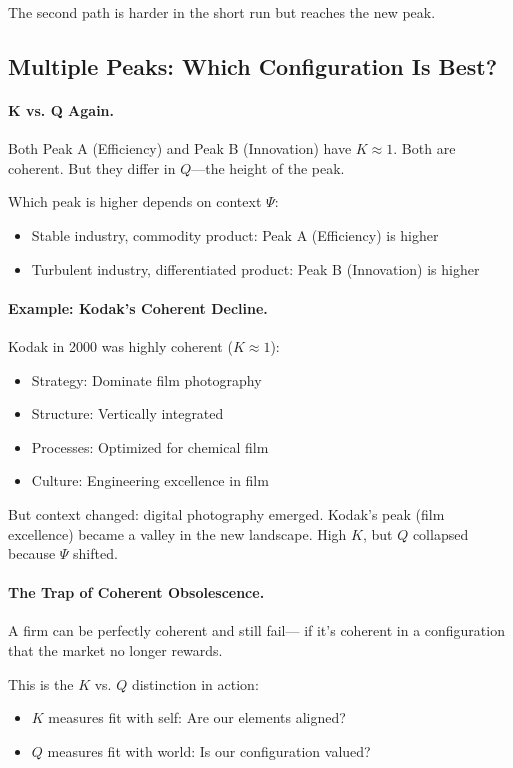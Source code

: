 The second path is harder in the short run but reaches the new peak.

\subsection{Multiple Peaks: Which Configuration Is Best?}

\paragraph{K vs. Q Again.}
Both Peak A (Efficiency) and Peak B (Innovation) have $K \approx 1$.
Both are coherent. But they differ in $Q$---the height of the peak.

Which peak is higher depends on context $\Psi$:
\begin{itemize}
  \item Stable industry, commodity product: Peak A (Efficiency) is higher
  \item Turbulent industry, differentiated product: Peak B (Innovation) is higher
\end{itemize}

\paragraph{Example: Kodak's Coherent Decline.}
Kodak in 2000 was highly coherent ($K \approx 1$):
\begin{itemize}
  \item Strategy: Dominate film photography
  \item Structure: Vertically integrated
  \item Processes: Optimized for chemical film
  \item Culture: Engineering excellence in film
\end{itemize}

But context changed: digital photography emerged.
Kodak's peak (film excellence) became a valley in the new landscape.
High $K$, but $Q$ collapsed because $\Psi$ shifted.

\paragraph{The Trap of Coherent Obsolescence.}
A firm can be perfectly coherent and still fail---
if it's coherent in a configuration that the market no longer rewards.

This is the $K$ vs. $Q$ distinction in action:
\begin{itemize}
  \item $K$ measures fit with self: Are our elements aligned?
  \item $Q$ measures fit with world: Is our configuration valued?
\end{itemize}

